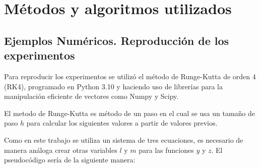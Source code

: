 \documentclass{wscpaperproc}
\theoremstyle{wsc}
\begin{document}
\section*{Métodos y algoritmos utilizados}


\subsection*{Ejemplos Numéricos. Reproducción de los experimentos}

Para reproducir los experimentos se utilizó el método de Runge-Kutta de orden 4 (RK4), programado
en Python 3.10 y haciendo uso de librerías para la manipulación eficiente de vectores como Numpy y
Scipy.

El metodo de Runge-Kutta es método de un paso en el cual se usa un tamaño de paso $h$ para calcular
los siguientes valores a partir de valores previos.

Como en este trabajo se utiliza un sistema de tres ecuaciones,
es necesario de manera análoga crear otras variables $l$ y $m$ para
las funciones $y$ y $z$. El pseudocódigo sería de la siguiente manera:
\end{document}
